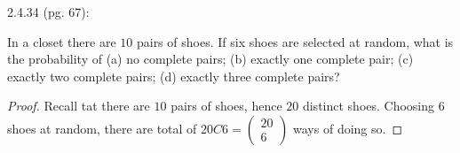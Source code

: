 \documentclass{article}
\begin{document}
\hfil

\begin{ques}\label{q5}
    2.4.34 (pg. 67):

    In a closet there are $10$ pairs of shoes. If six shoes are selected at random, what is the probability of (a) no complete pairs; (b) exactly one complete pair; (c) exactly two complete pairs; (d) exactly three complete pairs?
\end{ques}

\begin{proof}
    
    Recall tat there are $10$ pairs of shoes, hence $20$ distinct shoes. Choosing $6$ shoes at random, there are total of $20 C 6=\begin{pmatrix}20\\6\end{pmatrix}$ ways of doing so.


\end{proof}
\end{document}
